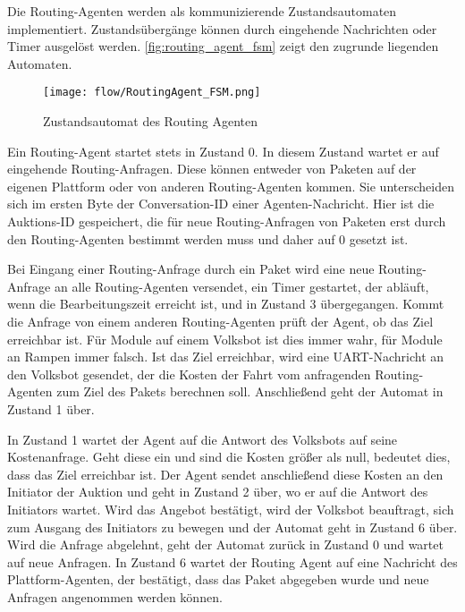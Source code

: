 Die Routing-Agenten werden als kommunizierende Zustandsautomaten implementiert. Zustandsübergänge können durch eingehende Nachrichten oder Timer ausgelöst werden. \autoref{fig:routing_agent_fsm} zeigt den zugrunde liegenden Automaten.

\begin{figure}[h!]
  \centering
    \texttt{[image: flow/RoutingAgent\_FSM.png]}
    \caption{Zustandsautomat des Routing Agenten}
    \label{fig:routing_agent_fsm}
\end{figure}

Ein Routing-Agent startet stets in Zustand 0. In diesem Zustand wartet er auf eingehende Routing-Anfragen. Diese können entweder von Paketen auf der eigenen Plattform oder von anderen Routing-Agenten kommen. Sie unterscheiden sich im ersten Byte der Conversation-ID einer Agenten-Nachricht. Hier ist die Auktions-ID gespeichert, die für neue Routing-Anfragen von Paketen erst durch den Routing-Agenten bestimmt werden muss und daher auf 0 gesetzt ist. 

Bei Eingang einer Routing-Anfrage durch ein Paket wird eine neue Routing-Anfrage an alle Routing-Agenten versendet, ein Timer gestartet, der abläuft, wenn die Bearbeitungszeit erreicht ist, und in Zustand 3 übergegangen. Kommt die Anfrage von einem anderen Routing-Agenten prüft der Agent, ob das Ziel erreichbar ist. Für Module auf einem Volksbot ist dies immer wahr, für Module an Rampen immer falsch. Ist das Ziel erreichbar, wird eine UART-Nachricht an den Volksbot gesendet, der die Kosten der Fahrt vom anfragenden Routing-Agenten zum Ziel des Pakets berechnen soll. Anschließend geht der Automat in Zustand 1 über.

In Zustand 1 wartet der Agent auf die Antwort des Volksbots auf seine Kostenanfrage. Geht diese ein und sind die Kosten größer als null, bedeutet dies, dass das Ziel erreichbar ist. Der Agent sendet anschließend diese Kosten an den Initiator der Auktion und geht in Zustand 2 über, wo er auf die Antwort des Initiators wartet. Wird das Angebot bestätigt, wird der Volksbot beauftragt, sich zum Ausgang des Initiators zu bewegen und der Automat geht in Zustand 6 über. Wird die Anfrage abgelehnt, geht der Automat zurück in Zustand 0 und wartet auf neue Anfragen. In Zustand 6 wartet der Routing Agent auf eine Nachricht des Plattform-Agenten, der bestätigt, dass das Paket abgegeben wurde und neue Anfragen angenommen werden können.

